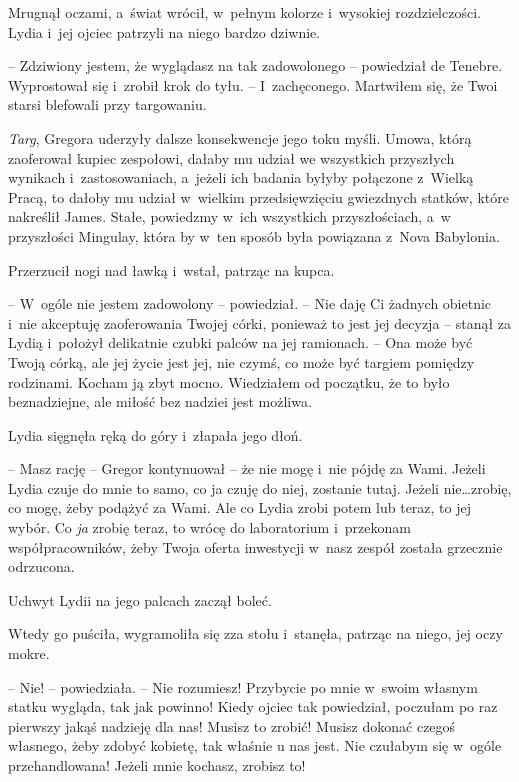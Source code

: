 \documentclass[oneside,polish,12pt,sfheadings]{mwbk}
\begin{document}
Mrugnął oczami, a~świat wrócił, w~pełnym kolorze i~wysokiej
rozdzielczości. Lydia i~jej ojciec patrzyli na niego bardzo dziwnie.

-- Zdziwiony jestem, że wyglądasz na tak zadowolonego -- powiedział de
Tenebre. Wyprostował się i~zrobił krok do tyłu. -- I~zachęconego.
Martwiłem się, że Twoi starsi blefowali przy targowaniu.

\emph{Targ}, Gregora uderzyły dalsze konsekwencje jego toku myśli.
Umowa, którą zaoferował kupiec zespołowi, dałaby mu udział we wszystkich
przyszłych wynikach i~zastosowaniach, a~jeżeli ich badania byłyby
połączone z~Wielką Pracą, to dałoby mu udział w~wielkim przedsięwzięciu
gwiezdnych statków, które nakreślił James. Stałe, powiedzmy w~ich
wszystkich przyszłościach, a~w przyszłości Mingulay, która by w~ten
sposób była powiązana z~Nova Babylonia.

Przerzucił nogi nad ławką i~wstał, patrząc na kupca.

-- W~ogóle nie jestem zadowolony -- powiedział. -- Nie daję Ci żadnych
obietnic i~nie akceptuję zaoferowania Twojej córki, ponieważ to jest jej
decyzja -- stanął za Lydią i~położył delikatnie czubki palców na jej
ramionach. -- Ona może być Twoją córką, ale jej życie jest jej, nie
czymś, co może być targiem pomiędzy rodzinami. Kocham ją zbyt mocno.
Wiedziałem od początku, że to było beznadziejne, ale miłość bez nadziei
jest możliwa.

Lydia sięgnęła ręką do góry i~złapała jego dłoń.

-- Masz rację -- Gregor kontynuował -- że nie mogę i~nie pójdę za Wami.
Jeżeli Lydia czuje do mnie to samo, co ja czuję do niej, zostanie tutaj.
Jeżeli nie\ldots zrobię, co mogę, żeby podążyć za Wami. Ale co Lydia
zrobi potem lub teraz, to jej wybór. Co \emph{ja} zrobię teraz, to wrócę
do laboratorium i~przekonam współpracowników, żeby Twoja oferta
inwestycji w~nasz zespół została grzecznie odrzucona.

Uchwyt Lydii na jego palcach zaczął boleć.

Wtedy go puściła, wygramoliła się zza stołu i~stanęła, patrząc na niego,
jej oczy mokre.

-- Nie! -- powiedziała. -- Nie rozumiesz! Przybycie po mnie w~swoim własnym
statku wygląda, tak jak powinno! Kiedy ojciec tak powiedział, poczułam
po raz pierwszy jakąś nadzieję dla nas! Musisz to zrobić! Musisz dokonać
czegoś własnego, żeby zdobyć kobietę, tak właśnie u nas jest. Nie
czułabym się w~ogóle przehandlowana! Jeżeli mnie kochasz, zrobisz to!
\end{document}
